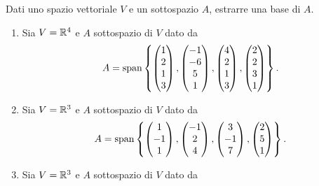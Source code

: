 \begin{exercise}
    Dati uno spazio vettoriale $V$ e un sottospazio $A$, estrarre una base di $A$.
    \begin{enumerate}
        \item Sia $V = \mathbb{R}^4$ e $A$ sottospazio di $V$ dato da \[
            A = \operatorname{span}\left\{\begin{pmatrix}
                1 \\ 2 \\ 1 \\ 3
            \end{pmatrix}, \begin{pmatrix}
                -1 \\ -6 \\ 5 \\ 1
            \end{pmatrix}, \begin{pmatrix}
                4 \\ 2 \\ 1 \\ 3
            \end{pmatrix}, \begin{pmatrix}
                2 \\ 2 \\ 3 \\ 1
            \end{pmatrix}\right\}.  
        \]
        \item Sia $V = \mathbb{R}^3$ e $A$ sottospazio di $V$ dato da \[
            A = \operatorname{span}\left\{\begin{pmatrix}
                1 \\ -1 \\ 1
            \end{pmatrix}, \begin{pmatrix}
                -1 \\ 2 \\ 4
            \end{pmatrix}, \begin{pmatrix}
                3 \\ -1 \\ 7
            \end{pmatrix}, \begin{pmatrix}
                2 \\ 5 \\ 1
            \end{pmatrix}\right\}.
        \]
        \item Sia $V = \mathbb{R}^3$ e $A$ sottospazio di $V$ dato da \[
\]
\end{enumerate}
\end{exercise}
